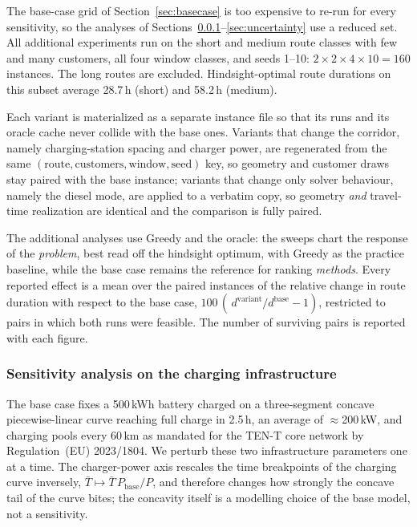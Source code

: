 The base-case grid of Section~\ref{sec:basecase} is too expensive to re-run for
every sensitivity, so the analyses of
Sections~\ref{sec:sensitivity}--\ref{sec:uncertainty} use a reduced set.  All
additional experiments run on the short and medium route classes with few and
many customers, all four window classes, and seeds 1--10:
$2 \times 2 \times 4 \times 10 = 160$ instances.  The long routes are excluded.
Hindsight-optimal route durations on this subset average 28.7\,h (short) and
58.2\,h (medium).

Each variant is materialized as a separate instance file so that its runs and
its oracle cache never collide with the base ones.  Variants that change the
corridor, namely charging-station spacing and charger power, are regenerated
from the same $(\text{route}, \text{customers}, \text{window}, \text{seed})$
key, so geometry and customer draws stay paired with the base instance;
variants that change only solver behaviour, namely the diesel mode, are applied
to a verbatim copy, so geometry \emph{and} travel-time realization are
identical and the comparison is fully paired.

The additional analyses use Greedy and the oracle: the sweeps chart the response
of the \emph{problem}, best read off the hindsight optimum, with Greedy as the
practice baseline, while the base case remains the reference for ranking
\emph{methods}.  Every reported effect is a mean over the paired instances of
the relative change in route duration with respect to the base case,
$100\,(\,d^{\text{variant}}/d^{\text{base}} - 1)$, restricted to pairs in which
both runs were feasible.  The number of surviving pairs is reported with each
figure.


\subsubsection{Sensitivity analysis on the charging infrastructure}
\label{sec:sensitivity}

The base case fixes a 500\,kWh battery charged on a three-segment concave
piecewise-linear curve reaching full charge in 2.5\,h, an average of
$\approx$200\,kW, and charging pools every 60\,km as mandated for the TEN-T core
network by Regulation~(EU) 2023/1804.  We perturb these two infrastructure
parameters one at a time.  The charger-power axis rescales the time breakpoints
of the charging curve inversely,
$\bar{T} \mapsto \bar{T}\,P_{\mathrm{base}}/P$, and therefore changes how
strongly the concave tail of the curve bites; the concavity itself is a
modelling choice of the base model, not a sensitivity.

